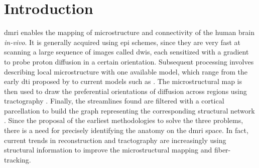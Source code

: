 \section{Introduction}\label{sec:introduction}
\Gls*{dmri} enables the mapping of microstructure \citep{basser_microstructural_1996}
  and connectivity \citep{craddock_imaging_2013} of the human brain \emph{in-vivo}.
It is generally acquired using \gls*{epi} schemes, since they are very fast at
  scanning a large sequence of images called \glspl*{dwi}, each sensitized with
  a gradient to probe proton diffusion in a certain orientation.
Subsequent processing involves describing local microstructure with one available
  model, which range from the early \gls*{dti} proposed by \cite{basser_microstructural_1996}
  to current models such as \citep{daducci_accelerated_2015}.
The microstructural map is then used to draw the preferential orientations of diffusion
  across regions using tractography \citep{mori_threedimensional_1999}.
Finally, the streamlines found are filtered with a cortical parcellation
  to build the graph representing the corresponding structural
  network \citep{hagmann_mapping_2008}.
Since the proposal of the earliest methodologies to solve the three problems,
  there is a need for precisely identifying the anatomy on the \gls*{dmri} space.
In fact, current trends in reconstruction \citep{jeurissen_multitissue_2014} and
  tractography \citep{smith_anatomicallyconstrained_2012} are increasingly using
  structural information to improve the microstructural mapping and fiber-tracking.

